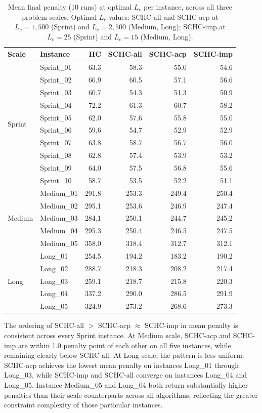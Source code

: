 \documentclass[12pt, a4paper, oneside]{report}
\begin{document}
\begin{table}[H]
\centering
\caption{Mean final penalty (10 runs) at optimal $L_c$ per instance,
across all three problem scales. Optimal $L_c$ values: SCHC-all and
SCHC-acp at $L_c = 1{,}500$ (Sprint) and $L_c = 2{,}500$ (Medium,
Long); SCHC-imp at $L_c = 25$ (Sprint) and $L_c = 15$ (Medium, Long).}
\label{tab:per_instance}
\small
\begin{tabular}{llrrrr}
\toprule
Scale & Instance & HC & SCHC-all & SCHC-acp & SCHC-imp \\
\midrule
\multirow{10}{*}{Sprint}
  & Sprint\_01 & 63.3 & 58.3 & 55.0 & 54.6 \\
  & Sprint\_02 & 66.9 & 60.5 & 57.1 & 56.6 \\
  & Sprint\_03 & 60.7 & 54.3 & 51.3 & 50.9 \\
  & Sprint\_04 & 72.2 & 61.3 & 60.7 & 58.2 \\
  & Sprint\_05 & 62.0 & 57.6 & 55.8 & 55.0 \\
  & Sprint\_06 & 59.6 & 54.7 & 52.9 & 52.9 \\
  & Sprint\_07 & 63.8 & 58.7 & 56.7 & 56.0 \\
  & Sprint\_08 & 62.8 & 57.4 & 53.9 & 53.2 \\
  & Sprint\_09 & 64.0 & 57.5 & 56.8 & 55.6 \\
  & Sprint\_10 & 58.7 & 53.5 & 52.2 & 51.1 \\
\midrule
\multirow{5}{*}{Medium}
  & Medium\_01 & 291.8 & 253.3 & 249.4 & 250.4 \\
  & Medium\_02 & 295.1 & 253.6 & 246.9 & 247.4 \\
  & Medium\_03 & 284.1 & 250.1 & 244.7 & 245.2 \\
  & Medium\_04 & 295.3 & 250.4 & 246.5 & 247.5 \\
  & Medium\_05 & 358.0 & 318.4 & 312.7 & 312.1 \\
\midrule
\multirow{5}{*}{Long}
  & Long\_01 & 254.5 & 194.2 & 183.2 & 190.2 \\
  & Long\_02 & 288.7 & 218.3 & 208.2 & 217.4 \\
  & Long\_03 & 259.1 & 218.7 & 215.8 & 220.3 \\
  & Long\_04 & 337.2 & 290.0 & 286.5 & 291.9 \\
  & Long\_05 & 324.9 & 273.2 & 268.6 & 273.3 \\
\bottomrule
\end{tabular}
\end{table}

 
The ordering of SCHC-all $>$ SCHC-acp $\approx$ SCHC-imp in mean penalty
is consistent across every Sprint instance. At Medium scale, SCHC-acp and
SCHC-imp are within 1.0 penalty point of each other on all five instances,
while remaining clearly below SCHC-all. At Long scale, the pattern is less
uniform: SCHC-acp achieves the lowest mean penalty on instances Long\_01
through Long\_03, while SCHC-imp and SCHC-all converge on instances Long\_04
and Long\_05. Instance Medium\_05 and Long\_04 both return substantially
higher penalties than their scale counterparts across all algorithms,
reflecting the greater constraint complexity of those particular instances.
 
\end{document}
